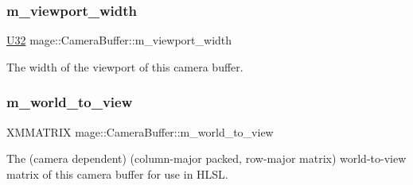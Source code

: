 \subsubsection{\texorpdfstring{m\+\_\+viewport\+\_\+width}{m\_viewport\_width}}
{\footnotesize\ttfamily \hyperlink{namespacemage_a41c104c036fba3756a74e19f793eeaa1}{U32} mage\+::\+Camera\+Buffer\+::m\+\_\+viewport\+\_\+width}

The width of the viewport of this camera buffer. \hypertarget{structmage_1_1_camera_buffer_a28db697d7da502479b3e29752122c9f4}{}\label{structmage_1_1_camera_buffer_a28db697d7da502479b3e29752122c9f4} 
\subsubsection{\texorpdfstring{m\+\_\+world\+\_\+to\+\_\+view}{m\_world\_to\_view}}
{\footnotesize\ttfamily X\+M\+M\+A\+T\+R\+IX mage\+::\+Camera\+Buffer\+::m\+\_\+world\+\_\+to\+\_\+view}

The (camera dependent) (column-\/major packed, row-\/major matrix) world-\/to-\/view matrix of this camera buffer for use in H\+L\+SL. 